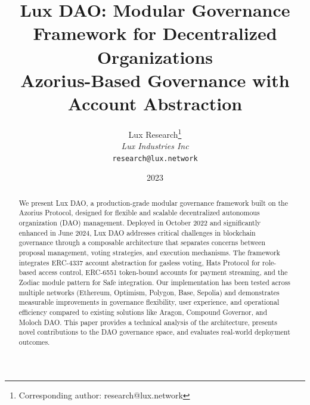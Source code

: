 \documentclass[11pt,a4paper]{article}
\title{\textbf{Lux DAO: Modular Governance Framework for Decentralized Organizations}\\
\large{Azorius-Based Governance with Account Abstraction}}
\author{
Lux Research\thanks{Corresponding author: research@lux.network}\\
\textit{Lux Industries Inc}\\
\texttt{research@lux.network}
}
\date{2023}
\begin{document}
\luxcoverpage

\begin{abstract}
We present Lux DAO, a production-grade modular governance framework built on the Azorius Protocol, designed for flexible and scalable decentralized autonomous organization (DAO) management. Deployed in October 2022 and significantly enhanced in June 2024, Lux DAO addresses critical challenges in blockchain governance through a composable architecture that separates concerns between proposal management, voting strategies, and execution mechanisms. The framework integrates ERC-4337 account abstraction for gasless voting, Hats Protocol for role-based access control, ERC-6551 token-bound accounts for payment streaming, and the Zodiac module pattern for Safe integration. Our implementation has been tested across multiple networks (Ethereum, Optimism, Polygon, Base, Sepolia) and demonstrates measurable improvements in governance flexibility, user experience, and operational efficiency compared to existing solutions like Aragon, Compound Governor, and Moloch DAO. This paper provides a technical analysis of the architecture, presents novel contributions to the DAO governance space, and evaluates real-world deployment outcomes.
\end{abstract}













\end{document}

